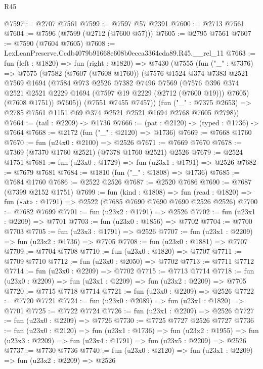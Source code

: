 \begin{lexlean}{R45}
\begin{coremodule}
@7597 := @2707 @7561
@7599 := @7597 @57 @2391
@7600 := @2713 @7561
@7604 := @7596 (@7599 (@2712 (@7600 @57)))
@7605 := @2795 @7561
@7607 := @7590 (@7604 @7605)
@7608 := LexLeanPreserve.Ccdb4079b91668e608b0ecca3364cda89.R45.__rel_11
@7663 := fun (left : @1820) =>
  fun (right : @1820) =>
  @7430
    (@7555
      (fun ("_" : @7376) =>
      @7575
        (@7582
          (@7607 (@7608 @1760))
          (@7576
            @1524
            @374
            @7383
            @2521
            @7569
            @1694
            (@7584
              @973
              @2526
              @7382
              @7496
              @7569
              (@7576 @396 @374 @2521 @2521 @2229 @1694 (@7597 @19 @2229 (@2712 (@7600 @19))) @7605)
              (@7608 @1751))
            @7605))
        (@7551 @7455 @7457))
      (fun ("_" : @7375 @2653) => @2785 @7561 @1151 @69 @374 @2521 @2521 @1694 @2768 @7605 @2798))
@7664 := (tail : @2209) -> @1736
@7666 := (pat : @2120) -> (typed : @1736) -> @7664
@7668 := @2172 (fun ("_" : @2120) => @1736)
@7669 := @7668 @1760
@7670 := fun (u24x0 : @2100) => @2526
@7671 := @7669 @7670
@7678 := @7369 (@7370 @1760 @2521) (@7378 @1760 @2521) @2526
@7679 := @2524 @1751
@7681 := fun (u23x0 : @1729) => fun (u23x1 : @1791) => @2526
@7682 := @7679 @7681
@7684 := @1810 (fun ("_" : @1808) => @1736)
@7685 := @7684 @1760
@7686 := @2522 @2526
@7687 := @2520 @7686
@7690 := @7687 (@7399 @2152 @1751)
@7699 := fun (kind : @1808) =>
  fun (read : @1820) => fun («at» : @1791) => @2522 (@7685 @7690 @7690 @7690 @2526 @2526)
@7700 := @7682 @7699
@7701 := fun (u23x2 : @1791) => @2526
@7702 := fun (u23x1 : @2209) => @7701
@7703 := fun (u23x0 : @1856) => @7702
@7704 := @7700 @7703
@7705 := fun (u23x3 : @1791) => @2526
@7707 := fun (u23x1 : @2209) => fun (u23x2 : @1736) => @7705
@7708 := fun (u23x0 : @1881) => @7707
@7709 := @7704 @7708
@7710 := fun (u23x0 : @1820) => @7707
@7711 := @7709 @7710
@7712 := fun (u23x0 : @2050) => @7702
@7713 := @7711 @7712
@7714 := fun (u23x0 : @2209) => @7702
@7715 := @7713 @7714
@7718 := fun (u23x0 : @2209) => fun (u23x1 : @2209) => fun (u23x2 : @2209) => @7705
@7720 := @7715 @7718 @7714
@7721 := fun (u23x0 : @2209) => @2526
@7722 := @7720 @7721
@7724 := fun (u23x0 : @2089) => fun (u23x1 : @1820) => @7701
@7725 := @7722 @7724
@7726 := fun (u23x1 : @2209) => @2526
@7727 := fun (u23x0 : @2209) => @7726
@7730 := @7725 @7727 @2526 @7727
@7736 := fun (u23x0 : @2120) =>
  fun (u23x1 : @1736) =>
  fun (u23x2 : @1955) => fun (u23x3 : @2209) => fun (u23x4 : @1791) => fun (u23x5 : @2209) => @2526
@7737 := @7730 @7736
@7740 := fun (u23x0 : @2120) => fun (u23x1 : @2209) => fun (u23x2 : @2209) => @2526

\end{coremodule}
\end{lexlean}
